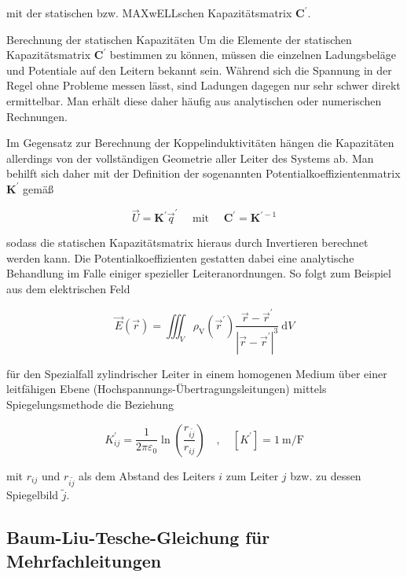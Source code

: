 mit der statischen bzw. MAXwELLschen Kapazitätsmatrix $\mathbf{C}^{\prime}$.

Berechnung der statischen Kapazitäten Um die Elemente der statischen Kapazitätsmatrix $\mathbf{C}^{\prime}$ bestimmen zu können, müssen die einzelnen Ladungsbeläge und Potentiale auf den Leitern bekannt sein. Während sich die Spannung in der Regel ohne Probleme messen lässt, sind Ladungen dagegen nur sehr schwer direkt ermittelbar. Man erhält diese daher häufig aus analytischen oder numerischen Rechnungen.

Im Gegensatz zur Berechnung der Koppelinduktivitäten hängen die Kapazitäten allerdings von der vollständigen Geometrie aller Leiter des Systems ab. Man behilft sich daher mit der Definition der sogenannten Potentialkoeffizientenmatrix $\mathbf{K}^{\prime}$ gemäß


\begin{equation}
	\vec{U}=\mathbf{K}^{\prime} \vec{q}^{\prime} \quad \text { mit } \quad \mathbf{C}^{\prime}=\mathbf{K}^{\prime-1} 
\end{equation}


sodass die statischen Kapazitätsmatrix hieraus durch Invertieren berechnet werden kann. Die Potentialkoeffizienten gestatten dabei eine analytische Behandlung im Falle einiger spezieller Leiteranordnungen. So folgt zum Beispiel aus dem elektrischen Feld


\begin{equation}
	\vec{E}(\vec{r})=\iiint_{V} \rho_{\mathrm{V}}\left(\vec{r}^{\prime}\right) \frac{\vec{r}-\vec{r}^{\prime}}{\left|\vec{r}-\vec{r}^{\prime}\right|^{3}} \mathrm{~d} V 
\end{equation}


für den Spezialfall zylindrischer Leiter in einem homogenen Medium über einer leitfähigen Ebene (Hochspannungs-Übertragungsleitungen) mittels Spiegelungsmethode die Beziehung


\begin{equation}
	K_{i j}^{\prime}=\frac{1}{2 \pi \varepsilon_{0}} \ln \left(\frac{r_{i \tilde{j}}}{r_{i j}}\right) \quad, \quad\left[K^{\prime}\right]=1 \mathrm{~m} / \mathrm{F} 
\end{equation}


mit $r_{i j}$ und $r_{i \tilde{j}}$ als dem Abstand des Leiters $i$ zum Leiter $j$ bzw. zu dessen Spiegelbild $\tilde{j}$.

\subsection{Baum-Liu-Tesche-Gleichung für Mehrfachleitungen}
